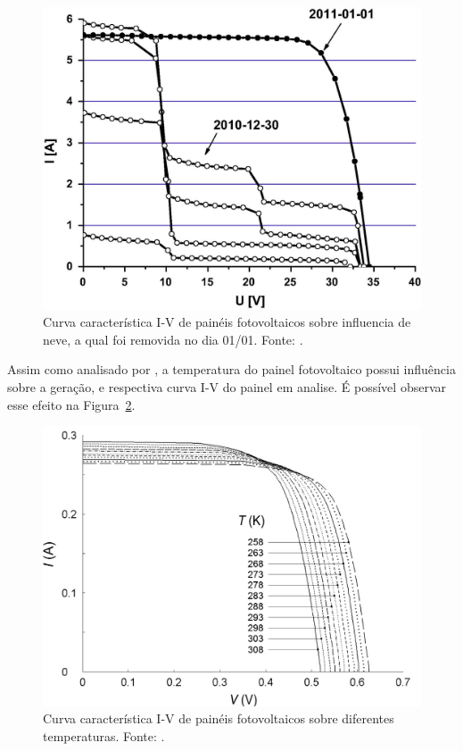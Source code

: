 \FloatBarrier
\begin{figure}[!htbp]
	\centering
	\includegraphics[scale=1.5]{imagens/IxV_schill}
	\caption{Curva característica I-V de painéis fotovoltaicos sobre influencia de neve, a qual foi removida no dia 01/01. Fonte: . }

	\label{fig:CurvaIVNeve}
\end{figure}
\FloatBarrier

Assim como analisado por  , a temperatura do painel fotovoltaico possui influência sobre a geração, e respectiva curva I-V do painel em analise. É possível observar esse efeito na Figura~\ref{fig:IVTemp}.

\FloatBarrier
\begin{figure}[!htbp]
	\centering
	\includegraphics[scale=0.3]{imagens/IxV_Temp}
	\caption{Curva característica I-V de painéis fotovoltaicos sobre diferentes temperaturas. Fonte: . }
	
	\label{fig:IVTemp}
\end{figure}
\FloatBarrier

